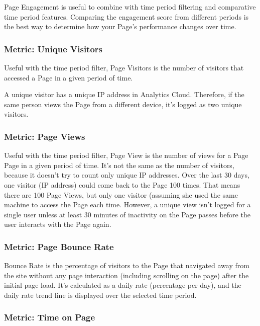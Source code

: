 Page Engagement is useful to combine with time period filtering and
comparative time period features. Comparing the engagement score from
different periods is the best way to determine how your Page's
performance changes over time.

\subsubsection{Metric: Unique Visitors}\label{metric-unique-visitors}

Useful with the time period filter, Page Visitors is the number of
visitors that accessed a Page in a given period of time.

A unique visitor has a unique IP address in Analytics Cloud. Therefore,
if the same person views the Page from a different device, it's logged
as two unique visitors.

\subsubsection{Metric: Page Views}\label{metric-page-views}

Useful with the time period filter, Page View is the number of views for
a Page Page in a given period of time. It's not the same as the number
of visitors, because it doesn't try to count only unique IP addresses.
Over the last 30 days, one visitor (IP address) could come back to the
Page 100 times. That means there are 100 Page Views, but only one
visitor (assuming she used the same machine to access the Page each
time. However, a unique view isn't logged for a single user unless at
least 30 minutes of inactivity on the Page passes before the user
interacts with the Page again.

\subsubsection{Metric: Page Bounce Rate}\label{metric-page-bounce-rate}

Bounce Rate is the percentage of visitors to the Page that navigated
away from the site without any page interaction (including scrolling on
the page) after the initial page load. It's calculated as a daily rate
(percentage per day), and the daily rate trend line is displayed over
the selected time period.

\subsubsection{Metric: Time on Page}\label{metric-time-on-page}

